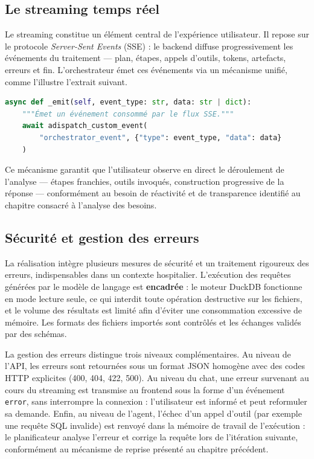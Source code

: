 \subsection{Le streaming temps réel}

Le streaming constitue un élément central de l'expérience utilisateur. Il repose sur le protocole \textit{Server-Sent Events} (SSE) : le backend diffuse progressivement les événements du traitement — plan, étapes, appels d'outils, tokens, artefacts, erreurs et fin. L'orchestrateur émet ces événements via un mécanisme unifié, comme l'illustre l'extrait suivant.

\begin{lstlisting}[language=Python, caption={Émission d'un événement de streaming}]
async def _emit(self, event_type: str, data: str | dict):
    """Émet un événement consommé par le flux SSE."""
    await adispatch_custom_event(
        "orchestrator_event", {"type": event_type, "data": data}
    )
\end{lstlisting}

Ce mécanisme garantit que l'utilisateur observe en direct le déroulement de l'analyse — étapes franchies, outils invoqués, construction progressive de la réponse — conformément au besoin de réactivité et de transparence identifié au chapitre consacré à l'analyse des besoins.

\subsection{Sécurité et gestion des erreurs}

La réalisation intègre plusieurs mesures de sécurité et un traitement rigoureux des erreurs, indispensables dans un contexte hospitalier. L'exécution des requêtes générées par le modèle de langage est \textbf{encadrée} : le moteur DuckDB fonctionne en mode lecture seule, ce qui interdit toute opération destructive sur les fichiers, et le volume des résultats est limité afin d'éviter une consommation excessive de mémoire. Les formats des fichiers importés sont contrôlés et les échanges validés par des schémas.

La gestion des erreurs distingue trois niveaux complémentaires. Au niveau de l'API, les erreurs sont retournées sous un format JSON homogène avec des codes HTTP explicites (400, 404, 422, 500). Au niveau du chat, une erreur survenant au cours du streaming est transmise au frontend sous la forme d'un événement \texttt{error}, sans interrompre la connexion : l'utilisateur est informé et peut reformuler sa demande. Enfin, au niveau de l'agent, l'échec d'un appel d'outil (par exemple une requête SQL invalide) est renvoyé dans la mémoire de travail de l'exécution : le planificateur analyse l'erreur et corrige la requête lors de l'itération suivante, conformément au mécanisme de reprise présenté au chapitre précédent.

